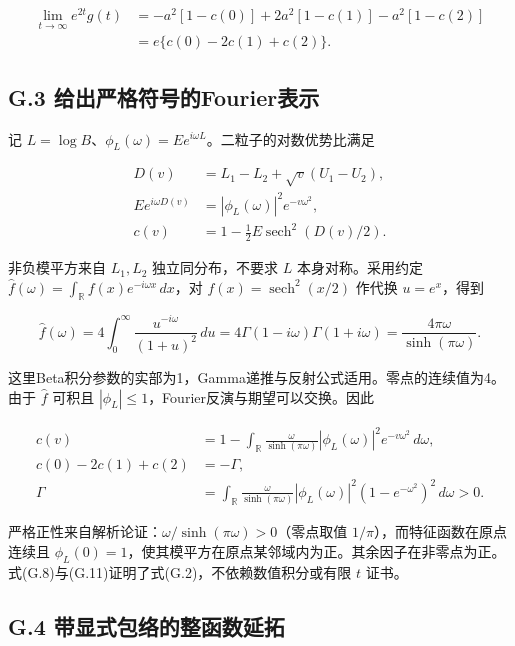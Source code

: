 \documentclass[11pt,a4paper]{article}
\begin{document}
\[
\begin{aligned}
\lim_{t\to\infty}e^{2t}g(t)
&=-a^2[1-c(0)]+2a^2[1-c(1)]-a^2[1-c(2)]\\
&=e\{c(0)-2c(1)+c(2)\}.
\end{aligned}
\tag{G.8}
\]

\subsection*{G.3
给出严格符号的Fourier表示}\label{g.3-ux7ed9ux51faux4e25ux683cux7b26ux53f7ux7684fourierux8868ux793a}

记
\(L=\log B\)、\(\phi_L(\omega)=Ee^{i\omega L}\)。二粒子的对数优势比满足

\[
\begin{aligned}
D(v)&=L_1-L_2+\sqrt v(U_1-U_2),\\
Ee^{i\omega D(v)}&=|\phi_L(\omega)|^2e^{-v\omega^2},\\
c(v)&=1-\tfrac12E\operatorname{sech}^2(D(v)/2).
\end{aligned}
\tag{G.9}
\]

非负模平方来自 \(L_1,L_2\) 独立同分布，不要求 \(L\) 本身对称。采用约定
\(\widehat f(\omega)=\int_{\mathbb R}f(x)e^{-i\omega x}\,dx\)，对
\(f(x)=\operatorname{sech}^2(x/2)\) 作代换 \(u=e^x\)，得到

\[
\widehat f(\omega)
=4\int_0^\infty\frac{u^{-i\omega}}{(1+u)^2}\,du
=4\Gamma(1-i\omega)\Gamma(1+i\omega)
=\frac{4\pi\omega}{\sinh(\pi\omega)}.
\tag{G.10}
\]

这里Beta积分参数的实部为1，Gamma递推与反射公式适用\citep[Sections 5.12
and 5.5]{nistdlmf}。零点的连续值为4。由于 \(\widehat f\) 可积且
\(|\phi_L|\le1\)，Fourier反演与期望可以交换。因此

\[
\begin{aligned}
c(v)&=1-\int_{\mathbb R}\frac{\omega}{\sinh(\pi\omega)}
|\phi_L(\omega)|^2e^{-v\omega^2}\,d\omega,\\
c(0)-2c(1)+c(2)&=-\Gamma,\\
\Gamma&=\int_{\mathbb R}\frac{\omega}{\sinh(\pi\omega)}
|\phi_L(\omega)|^2(1-e^{-\omega^2})^2\,d\omega>0.
\end{aligned}
\tag{G.11}
\]

严格正性来自解析论证：\(\omega/\sinh(\pi\omega)>0\)（零点取值
\(1/\pi\)），而特征函数在原点连续且
\(\phi_L(0)=1\)，使其模平方在原点某邻域内为正。其余因子在非零点为正。式(G.8)与(G.11)证明了式(G.2)，不依赖数值积分或有限
\(t\) 证书。

\subsection*{G.4
带显式包络的整函数延拓}\label{g.4-ux5e26ux663eux5f0fux5305ux7edcux7684ux6574ux51fdux6570ux5ef6ux62d3}
\end{document}
